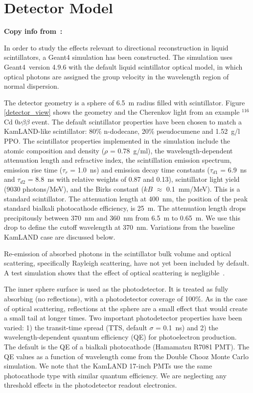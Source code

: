 \section{Detector Model}
\label{sec:detector_description}
{\bf Copy info from~\cite{Aberle2014}:}

In order to study the effects relevant to directional reconstruction
in liquid scintillators, a Geant4\cite{geant4one,geant4two} simulation
has been constructed. The simulation uses Geant4~version 4.9.6 with the default liquid scintillator
optical model, in which optical photons are
assigned the group velocity in the wavelength region of normal
dispersion.

The detector geometry is a sphere of 6.5~m radius filled with
scintillator. Figure \ref{detector_view} shows the geometry and the
Cherenkov light from an example $^{116}$Cd $0\nu\beta\beta$ event. The
default scintillator properties have been chosen to match a KamLAND-like
scintillator\cite{kamland2003}: 80\% n-dodecane, 20\% pseudocumene and 1.52~g/l PPO. The
scintillator properties implemented in the simulation include the
atomic composition and density ($\rho$ = 0.78~g/ml), the
wavelength-dependent attenuation length\cite{tajimaMaster} and
refractive index\cite{OlegThesis}, the scintillation emission
spectrum\cite{tajimaMaster}, emission rise time ($\tau_r$ = 1.0~ns)
and emission decay time constants ($\tau_{d1}$ = 6.9~ns and
$\tau_{d2}$ = 8.8~ns with relative weights of 0.87 and 
0.13)\cite{tajimaThesis}, scintillator light yield (9030 photons/MeV),
and the Birks constant ($kB$ $\approx$ 0.1~mm/MeV)\cite{ChrisThesis}.  This is a standard scintillator. The attenuation length at 400~nm, the position of the peak standard bialkali photocathode efficiency, is 25~m. The attenuation length drops precipitously between 370~nm and 360~nm from 6.5~m to 0.65~m. We use this drop to define the cutoff wavelength at 370~nm. Variations from the baseline KamLAND case are discussed below. 

Re-emission of absorbed photons in the scintillator
bulk volume and optical scattering, specifically Rayleigh scattering, have not yet been included by default. A test simulation shows that the effect of optical scattering is negligible~\cite{Aberle2014}.

The inner sphere surface is used as the photodetector. It is treated
as fully absorbing (no reflections), with a photodetector coverage of
100\%. As in the case of optical scattering, reflections at the sphere are a small effect that would create a small tail at longer times. Two important photodetector properties have been varied: 1)
the transit-time spread (TTS, default $\sigma$ = 0.1~ns) and 2) the
wavelength-dependent quantum efficiency (QE) for photoelectron
production. The default is the QE of a bialkali photocathode (Hamamatsu
R7081 PMT)\cite{Hamamatsu_R7081}. The QE values as a function of wavelength come from the Double Chooz\cite{dctwo}
Monte Carlo simulation. We note that the KamLAND 17-inch PMTs use the
same photocathode type with similar quantum efficiency. We are neglecting any threshold effects in the photodetector readout electronics.


